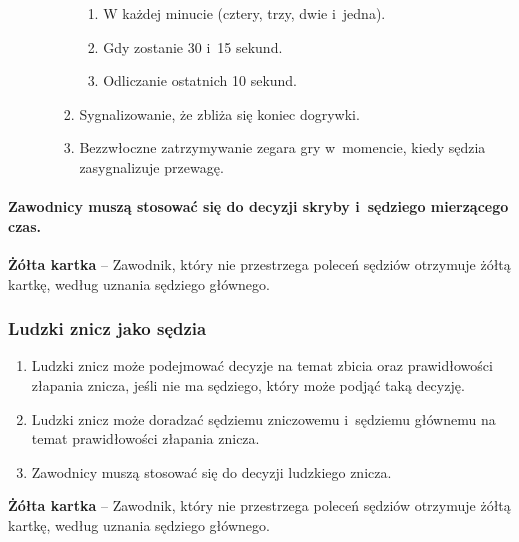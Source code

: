 \documentclass[12pt,a4paper]{article}
\newcommand\yellowcard[1]{\bgroup\textcolor{darkyellow}{\textbf{#1}}}
\begin{document}
\begin{enumerate}
\begin{enumerate}
\begin{enumerate}
			                  \begin{enumerate}
				                  \item
				                        W każdej minucie (cztery, trzy, dwie i~jedna).
				                  \item
				                        Gdy zostanie 30 i~15 sekund.
				                  \item
				                        Odliczanie ostatnich 10 sekund.
			                  \end{enumerate}
			            \item
			                  Sygnalizowanie, że zbliża się koniec dogrywki.
			            \item
			                  Bezzwłoczne zatrzymywanie zegara gry w~momencie, kiedy sędzia
			                  zasygnalizuje przewagę.
		            \end{enumerate}
	      \end{enumerate}
\end{enumerate}

\paragraph{Zawodnicy muszą stosować się do decyzji skryby i~sędziego mierzącego czas.}

\yellowcard{Żółta kartka} -- Zawodnik, który nie przestrzega poleceń sędziów
otrzymuje żółtą kartkę, według uznania sędziego głównego.

\subsubsection{Ludzki znicz jako sędzia}

\begin{enumerate}
	\item Ludzki znicz może podejmować decyzje na temat zbicia oraz
	      prawidłowości złapania znicza, jeśli nie ma sędziego, który może podjąć
	      taką decyzję.

	\item Ludzki znicz może doradzać sędziemu zniczowemu i~sędziemu głównemu na
	      temat prawidłowości złapania znicza.

	\item Zawodnicy muszą stosować się do decyzji ludzkiego znicza.
\end{enumerate}

\yellowcard{Żółta kartka} -- Zawodnik, który nie przestrzega poleceń sędziów
otrzymuje żółtą kartkę, według uznania sędziego głównego.
\end{document}

